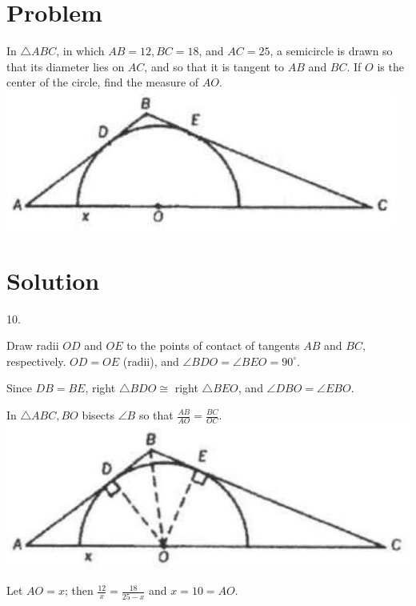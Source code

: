\documentclass{article}
\begin{document}
\section*{Problem}
In \(\triangle A B C\), in which \(A B=12, B C=18\), and \(A C=25\), a semicircle is drawn so that its diameter lies on \(A C\), and so that it is tangent to \(A B\) and \(B C\). If \(O\) is the center of the circle, find the measure of \(A O\).\\
\centering
\includegraphics[width=\textwidth]{images/156.jpg}

\section*{Solution}
10.


Draw radii \(O D\) and \(O E\) to the points of contact of tangents \(A B\) and \(B C\), respectively. \(O D=O E\) (radii), and \(\angle B D O=\angle B E O=90^{\circ}\).

Since \(D B=B E\), right \(\triangle B D O \cong\) right \(\triangle B E O\), and \(\angle D B O=\angle E B O\).

In \(\triangle A B C, B O\) bisects \(\angle B\) so that \(\frac{A B}{A O}=\frac{B C}{O C}\).\\
\centering
\includegraphics[width=\textwidth]{images/160.jpg}

Let \(A O=x\); then \(\frac{12}{x}=\frac{18}{25-x}\) and \(x=10=A O\).
\end{document}
